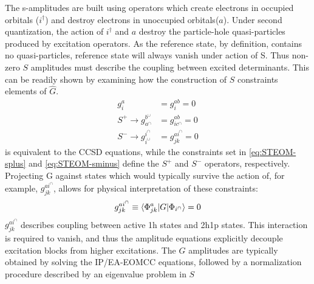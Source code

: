 The s-amplitudes are built using operators which create electrons in occupied orbitals ($i^\dag$) and destroy electrons in unoccupied orbitals($a$). Under second quantization, the action of $i^\dag$ and $a$ destroy the particle-hole quasi-particles produced by excitation operators. As the reference state, by definition, contains no quasi-particles, reference state will always vanish under action of S. Thus non-zero $S$ amplitudes must describe the coupling between excited determinants. This can be readily shown by examining how the construction of $S$ constraints elements of $\hat{G}$. 
\begin{align}
g_i^a &= g_i^{ab} = 0 \label{eq:STEOM-CCSD}\\
S^+ \rightarrow g^{b^{\cup}}_{a^{\cap}}& = g^{ab}_{ic^{\cap}} =0 \label{eq:STEOM-splus}\\
S^- \rightarrow g^{i^{\cap}}_{i^{\cup}} &= g^{ai^{\cap}}_{jk} =0 \label{eq:STEOM-sminus} 
\end{align}
 is equivalent to the CCSD equations, while the constraints set in \cref{eq:STEOM-splus} and \cref{eq:STEOM-sminus} define the $S^+$ and $S^-$ operators, respectively. Projecting G against states which would typically survive the action of, for example, $g^{ai^{\cap}}_{jk}$, allows for physical interpretation of these constraints:
\begin{align}
g^{ai^{\cap}}_{jk} \equiv \braket{\Phi^a_{jk}|G|\Phi_{i^{\cap}}} = 0
\end{align}
$g^{ai^{\cap}}_{jk}$ describes coupling between active 1h states and 2h1p states. This interaction is required to vanish, and thus the amplitude equations explicitly decouple excitation blocks from higher excitations. The $G$ amplitudes are typically obtained by solving the IP/EA-EOMCC equations, followed by a normalization procedure described by an eigenvalue problem in $S$ \\

